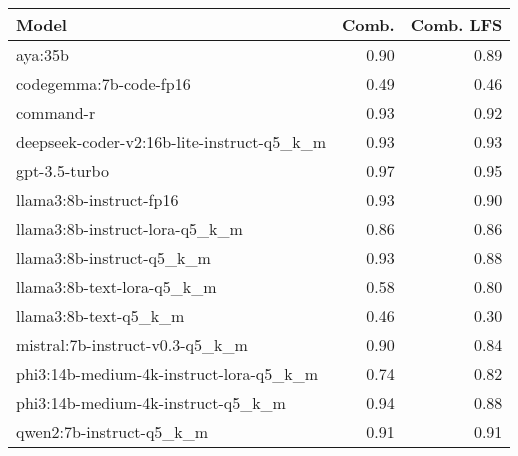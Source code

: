 \begin{tabular}{lrr}
\toprule
Model & Comb. & Comb. LFS \\
\midrule
aya:35b & 0.90 & 0.89 \\
codegemma:7b-code-fp16 & 0.49 & 0.46 \\
command-r & 0.93 & 0.92 \\
deepseek-coder-v2:16b-lite-instruct-q5\_k\_m & 0.93 & 0.93 \\
gpt-3.5-turbo & 0.97 & 0.95 \\
llama3:8b-instruct-fp16 & 0.93 & 0.90 \\
llama3:8b-instruct-lora-q5\_k\_m & 0.86 & 0.86 \\
llama3:8b-instruct-q5\_k\_m & 0.93 & 0.88 \\
llama3:8b-text-lora-q5\_k\_m & 0.58 & 0.80 \\
llama3:8b-text-q5\_k\_m & 0.46 & 0.30 \\
mistral:7b-instruct-v0.3-q5\_k\_m & 0.90 & 0.84 \\
phi3:14b-medium-4k-instruct-lora-q5\_k\_m & 0.74 & 0.82 \\
phi3:14b-medium-4k-instruct-q5\_k\_m & 0.94 & 0.88 \\
qwen2:7b-instruct-q5\_k\_m & 0.91 & 0.91 \\
\bottomrule
\end{tabular}
